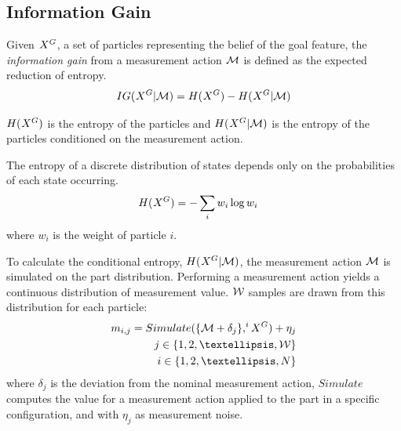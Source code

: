 \documentclass[../thesis.tex]{subfiles}
\begin{document}
\subsection{Information Gain} \label{subsec:IG}
Given $\particles[][][G]$, a set of particles representing the belief of the goal feature, 
the \textit{information gain} from a measurement action $\mathcal{M}$ is defined as the expected reduction of entropy.
\begin{align}
IG(\particles[][][G]|\maction) = H(\particles[][][G]) - H(\particles[][][G]|\maction)
\end{align}

$H(\particles[][][G])$ is the entropy of the particles and $H(\particles[][][G]|\maction)$ is the entropy of the particles conditioned on the measurement action.

The entropy of a discrete distribution of states depends only on the probabilities of each state occurring. 
\begin{align}
    H(\particles[][][G]) &= -\sum_i {w_i  \log w_i} 
\end{align}
where $w_i$ is the weight of particle $i$.

To calculate the conditional entropy, $H(\particles[][][G]|\maction)$, the measurement action $\mathcal{M}$ is simulated on the part distribution. Performing a measurement action yields a continuous distribution of measurement value. $\mathcal{W}$ samples are drawn from this distribution for each particle:
\begin{align}
  \measurement_{i,j} = Simulate(\{\maction + \delta_j\}, \particles[][i][G]) + \eta_j \label{Eq:Simulate}\\
  j\in \{1, 2, \textellipsis, \totalWeight\}\\
  i\in \{1, 2, \textellipsis, N\}
\end{align}
where $\delta_j$ is the deviation from the nominal measurement action, $Simulate$ computes the value for a measurement action applied to the part in a specific configuration, and with $\eta_j$ as measurement noise.
\end{document}
